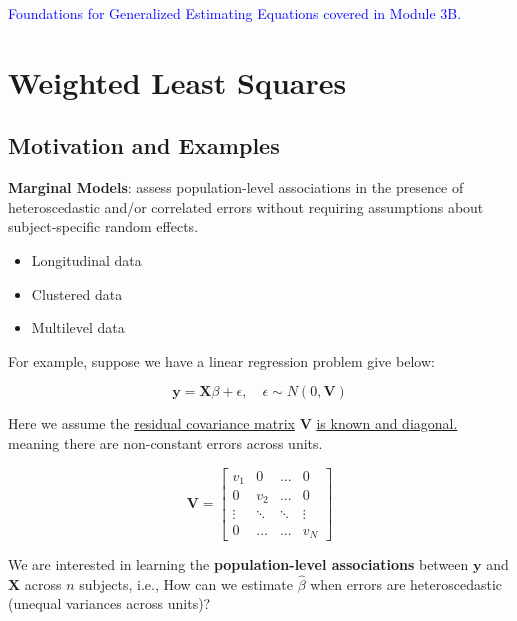 \documentclass[
  letterpaper,
  DIV=11,
  numbers=noendperiod]{scrreprt}
\providecommand{\tightlist}{%
  \setlength{\itemsep}{0pt}\setlength{\parskip}{0pt}}\usepackage{longtable,booktabs,array}
\begin{document}
\textcolor{blue}{Foundations for Generalized Estimating Equations covered in Module 3B.}

\hypertarget{weighted-least-squares}{%
\section*{Weighted Least Squares}\label{weighted-least-squares}}


\hypertarget{motivation-and-examples-5}{%
\subsection*{Motivation and Examples}\label{motivation-and-examples-5}}

\begin{tcolorbox}[enhanced jigsaw, breakable, colbacktitle=quarto-callout-important-color!10!white, left=2mm, colframe=quarto-callout-important-color-frame, opacityback=0, coltitle=black, colback=white, rightrule=.15mm, title=\textcolor{quarto-callout-important-color}{\faExclamation}\hspace{0.5em}{Motivation:}, titlerule=0mm, opacitybacktitle=0.6, leftrule=.75mm, toprule=.15mm, arc=.35mm, bottomtitle=1mm, toptitle=1mm, bottomrule=.15mm]

\textbf{Marginal Models}: assess population-level associations in the
presence of heteroscedastic and/or correlated errors without requiring
assumptions about subject-specific random effects.

\begin{itemize}
\tightlist
\item
  Longitudinal data
\item
  Clustered data
\item
  Multilevel data
\end{itemize}

For example, suppose we have a linear regression problem give below:

\[
\mathbf{y} = \mathbf{X} \beta + \epsilon, \quad \epsilon \sim N(0, \mathbf{V})
\]

Here we assume the \ul{residual covariance matrix} \(\mathbf{V}\) \ul{is
known and diagonal.} meaning there are non-constant errors across units.

\[
\mathbf{V} = \begin{bmatrix}
v_1 & 0 & ... & 0 \\
0 & v_2 & ... & 0 \\
\vdots & \ddots & \ddots & \vdots\\
0 & ... & ... & v_N \end{bmatrix}
\]

We are interested in learning the \textbf{population-level associations}
between \(\mathbf{y}\) and \(\mathbf{X}\) across \(n\) subjects, i.e.,
How can we estimate \(\hat{\beta}\) when errors are heteroscedastic
(unequal variances across units)?

\end{tcolorbox}
\end{document}
